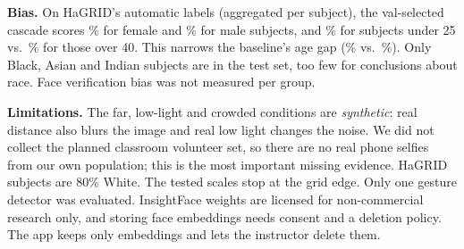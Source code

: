 \noindent\textbf{Bias.} On HaGRID's automatic labels (aggregated per subject), the val-selected cascade scores
\mpBiasTgenderfemale\% for female and \mpBiasTgendermale\% for male subjects, and \mpBiasTagegroupYoung\% for
subjects under 25 vs.\ \mpBiasTagegroupOld\% for those over 40. This narrows the baseline's age gap
(\mpBiasFullagegroupYoung\% vs.\ \mpBiasFullagegroupOld\%). Only \mpBiasNraceBlack{} Black, \mpBiasNraceAsian{} Asian
and \mpBiasNraceIndian{} Indian subjects are in the test set, too few for conclusions about race. Face verification
bias was not measured per group.

\noindent\textbf{Limitations.} The far, low-light and crowded conditions are \emph{synthetic}: real distance also
blurs the image and real low light changes the noise. We did not collect the planned classroom volunteer set, so
there are no real phone selfies from our own population; this is the most important missing evidence. HaGRID
subjects are 80\% White. The tested scales stop at the grid edge. Only one gesture detector was evaluated.
InsightFace weights are licensed for non-commercial research only, and storing face embeddings needs consent and a
deletion policy. The app keeps only embeddings and lets the instructor delete them.
